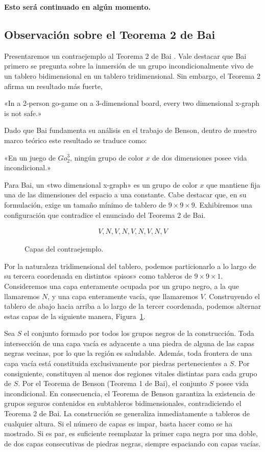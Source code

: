 \textbf{Esto será continuado en algún momento.}

\vspace{1cm}
\subsection{Observación sobre el Teorema 2 de Bai}
Presentaremos un contraejemplo al Teorema 2 de Bai \cite{KJB1, KJB2}. Vale destacar que Bai primero se pregunta sobre la inmersión de un grupo incondicionalmente vivo de un tablero bidimensional en un tablero tridimensional. Sin embargo, el Teorema 2 afirma un resultado más fuerte,

«In a 2-person go-game on a 3-dimensional board, every two dimensional x-graph is not safe.»

Dado que Bai fundamenta su análisis en el trabajo de Benson, dentro de nuestro marco teórico este resultado se traduce como:

«En un juego de $Go_{2}^{3}$, ningún grupo de color $x$ de dos dimensiones posee vida incondicional.» 

Para Bai, un «two dimensional x-graph» es un grupo de color $x$ que mantiene fija una de las dimensiones del espacio a una constante. Cabe destacar que, en su formulación, exige un tamaño mínimo de tablero de $9 \times 9 \times 9$. Exhibiremos una configuración que contradice el enunciado del Teorema 2 de Bai.


\begin{figure}
	\vspace{-15pt}
	\begin{align*}
		V,N,V,N,V,N,V,N,V
	\end{align*}
	\caption{Capas del contraejemplo.}
	\label{contraej_bai}
\end{figure}Por la naturaleza tridimensional del tablero, podemos particionarlo a lo largo de su tercera coordenada en distintos «pisos» como tableros de $9\times 9 \times 1$. Consideremos una capa enteramente ocupada por un grupo negro, a la que llamaremos $N$, y una capa enteramente vacía, que llamaremos $V$. Construyendo el tablero de abajo hacia arriba a lo largo de la tercer coordenada, podemos alternar estas capas de la siguiente manera, Figura~\ref{contraej_bai}.

Sea $S$ el conjunto formado por todos los grupos negros de la construcción. Toda intersección de una capa vacía es adyacente a una piedra de alguna de las capas negras vecinas, por lo que la región es saludable. Además, toda frontera de una capa vacía está constituida exclusivamente por piedras pertenecientes a $S$.
Por consiguiente, constituyen al menos dos regiones vitales distintas para cada grupo de $S$. Por el Teorema de Benson (Teorema 1 de Bai), el conjunto $S$ posee vida incondicional. En consecuencia, el Teorema de Benson garantiza la existencia de grupos seguros contenidos en subtableros bidimensionales, contradiciendo el Teorema 2 de Bai. La construcción se generaliza inmediatamente a tableros de cualquier altura. Si el número de capas es impar, basta hacer como se ha mostrado. Si es par, es suficiente reemplazar la primer capa negra por una doble, de dos capas consecutivas de piedras negras, siempre espaciando con capas vacías.

